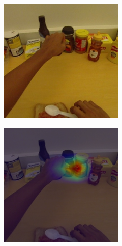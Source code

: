 \documentclass[10pt,twocolumn,hidelinks,letterpaper]{article}
\begin{document}
\begin{figure}[t]
  \centering
  \begin{subfigure}{.32\linewidth}
  	\includegraphics[width=\linewidth]{images/Cams3/S2_take_peanut/rgb0004.png}
  \end{subfigure}
  \begin{subfigure}{.32\linewidth}
  	\includegraphics[width=\linewidth]{images/Cams3/S2_take_peanut/rgb0004_CAM.png}

\end{subfigure}
\end{figure}
\end{document}
